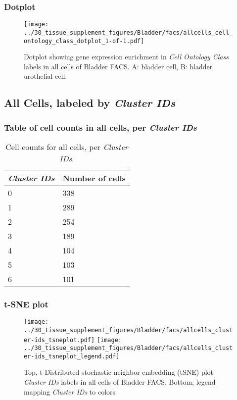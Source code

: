 \clearpage

\subsubsection{Dotplot}
\begin{figure}[h]
\centering
\texttt{[image: ../30\_tissue\_supplement\_figures/Bladder/facs/allcells\_cell\_ontology\_class\_dotplot\_1-of-1.pdf]}

\caption{ Dotplot  showing gene expression enrichment in \emph{Cell Ontology Class} labels in all cells of Bladder FACS. A: bladder cell, B: bladder urothelial cell.}
\end{figure}


\clearpage

\subsection{All Cells, labeled by \emph{Cluster IDs}}
\subsubsection{Table of cell counts in all cells, per \emph{Cluster IDs}}\begin{table}[h]
\centering
\label{my-label}
\begin{tabular}{@{}ll@{}}
\toprule

\emph{Cluster IDs}& Number of cells \\ \midrule
0 & 338 \\

1 & 289 \\

2 & 254 \\

3 & 189 \\

4 & 104 \\

5 & 103 \\

6 & 101 \\
\bottomrule
\end{tabular}
\caption{Cell counts for all cells, per \emph{Cluster IDs}.}
\end{table}

\clearpage
\subsubsection{t-SNE plot}
\begin{figure}[h]
\centering
\texttt{[image: ../30\_tissue\_supplement\_figures/Bladder/facs/allcells\_cluster-ids\_tsneplot.pdf]}
\texttt{[image: ../30\_tissue\_supplement\_figures/Bladder/facs/allcells\_cluster-ids\_tsneplot\_legend.pdf]}
\caption{Top, t-Distributed stochastic neighbor embedding (tSNE) plot  \emph{Cluster IDs} labels in all cells of Bladder FACS. Bottom, legend mapping \emph{Cluster IDs} to colors}
\end{figure}


